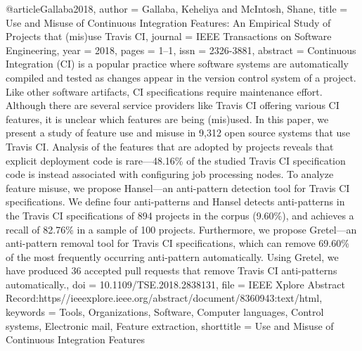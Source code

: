 {{@article{Gallaba2018,
  author     = {Gallaba, Keheliya and McIntosh, Shane},
  title      = {Use and {Misuse} of {Continuous} {Integration} {Features}: {An} {Empirical} {Study} of {Projects} that (mis)use {Travis} {CI}},
  journal    = {IEEE Transactions on Software Engineering},
  year       = {2018},                
  pages      = {1--1},
  issn       = {2326-3881},
  abstract   = {Continuous Integration (CI) is a popular practice where software systems are automatically compiled and tested as changes appear in the version control system of a project. Like other software artifacts, CI specifications require maintenance effort. Although there are several service providers like Travis CI offering various CI features, it is unclear which features are being (mis)used. In this paper, we present a study of feature use and misuse in 9,312 open source systems that use Travis CI. Analysis of the features that are adopted by projects reveals that explicit deployment code is rare—48.16\% of the studied Travis CI specification code is instead associated with configuring job processing nodes. To analyze feature misuse, we propose Hansel—an anti-pattern detection tool for Travis CI specifications. We define four anti-patterns and Hansel detects anti-patterns in the Travis CI specifications of 894 projects in the corpus (9.60\%), and achieves a recall of 82.76\% in a sample of 100 projects. Furthermore, we propose Gretel—an anti-pattern removal tool for Travis CI specifications, which can remove 69.60\% of the most frequently occurring anti-pattern automatically. Using Gretel, we have produced 36 accepted pull requests that remove Travis CI anti-patterns automatically.},
  doi        = {10.1109/TSE.2018.2838131},
  file       = {IEEE Xplore Abstract Record:https\://ieeexplore.ieee.org/abstract/document/8360943:text/html},
  keywords   = {Tools, Organizations, Software, Computer languages, Control systems, Electronic mail, Feature extraction},
  shorttitle = {Use and {Misuse} of {Continuous} {Integration} {Features}}
}

}}
